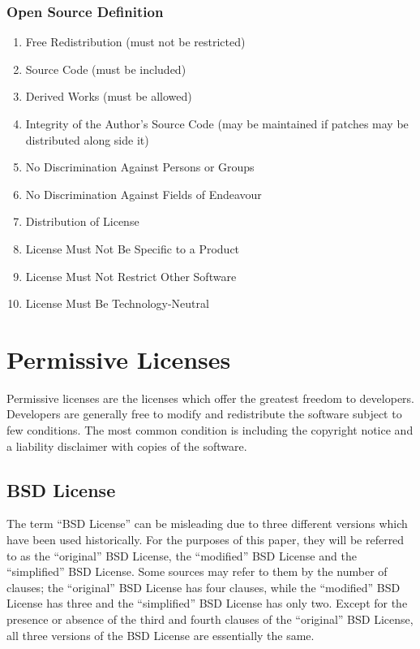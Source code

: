 \documentclass[12pt,letterpaper]{article}
\begin{document}
\subsubsection*{Open Source Definition\cite{opensourcedefinition}}
\begin{enumerate}
\item Free Redistribution (must not be restricted)
\item Source Code (must be included)
\item Derived Works (must be allowed)
\item Integrity of the Author's Source Code (may be maintained if patches may be distributed along side it)
\item No Discrimination Against Persons or Groups
\item No Discrimination Against Fields of Endeavour
\item Distribution of License
\item License Must Not Be Specific to a Product
\item License Must Not Restrict Other Software
\item License Must Be Technology-Neutral
\end{enumerate}

\section{Permissive Licenses}

Permissive licenses are the licenses which offer the greatest freedom to developers. Developers are generally free to modify and redistribute the software subject to few conditions. The most common condition is including the copyright notice and a liability disclaimer with copies of the software.\cite{permissive}

\subsection{BSD License}

The term ``BSD License'' can be misleading due to three different versions which have been used historically.\cite{netbsd} For the purposes of this paper, they will be referred to as the ``original'' BSD License, the ``modified'' BSD License and the ``simplified'' BSD License. Some sources may refer to them by the number of clauses; the ``original'' BSD License has four clauses, while the ``modified'' BSD License has three and the ``simplified'' BSD License has only two. Except for the presence or absence of the third and fourth clauses of the ``original'' BSD License, all three versions of the BSD License are essentially the same.
\end{document}
